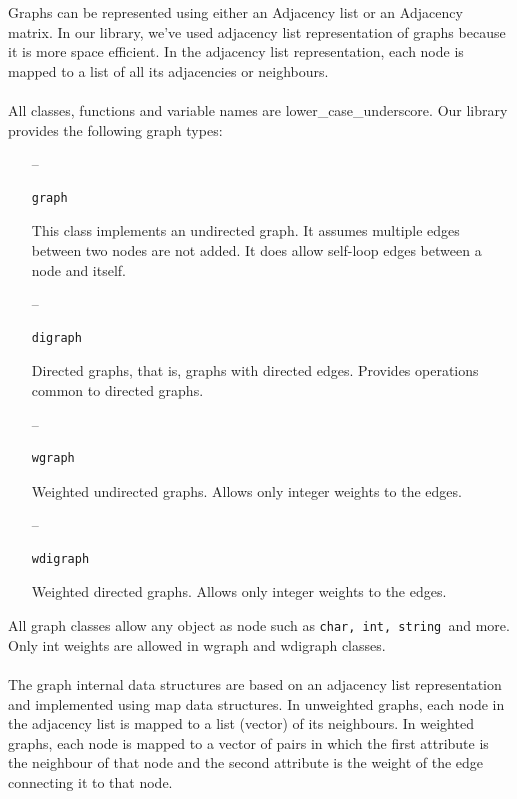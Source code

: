 \documentclass[11pt,a4paper]{article}
\begin{document}
Graphs can be represented using either an Adjacency list or an Adjacency matrix. In our library, we’ve used adjacency list representation of graphs because it is more space efficient. In the adjacency list representation, each node is mapped to a list of all its adjacencies or neighbours.
\\
\\
All classes, functions and variable names are lower\_case\_underscore. Our library provides the following graph types:
\\
\begin{itemize}  
\item[--] \begin{verbatim}
graph
\end{verbatim}

This class implements an undirected graph. It assumes multiple edges between two nodes are not added. It does allow self-loop edges between a node and itself.

\item[--]\begin{verbatim}
digraph
\end{verbatim} 

Directed graphs, that is, graphs with directed edges. Provides operations common to directed graphs.

\item[--] \begin{verbatim}
wgraph
\end{verbatim}

Weighted undirected graphs. Allows only integer weights to the edges.
\item[--] \begin{verbatim}
wdigraph
\end{verbatim}

Weighted directed graphs. Allows only integer weights to the edges.
\\
\end{itemize}  
All graph classes allow any object as node such as \texttt{char, int, string }and more. Only int weights are allowed in wgraph and wdigraph classes.
\\
\\
The graph internal data structures are based on an adjacency list representation and implemented using map data structures. In unweighted graphs, each node in the adjacency list is mapped to a list (vector) of its neighbours. In weighted graphs, each node is mapped to a vector of pairs in which the first attribute is the neighbour of that node and the second attribute is the weight of the edge connecting it to that node.
\end{document}

